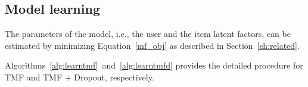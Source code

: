\subsection{Model learning}
The parameters of the model, i.e., the user and the item latent factors, can be estimated by minimizing Equation~\ref{mf_obj} as described in Section~\ref{ch:related}.
\iffalse
\begin{equation} \label{mf_drop_obj}
  \begin{aligned}
    \minimize_{\bm{p_u}, \bm{q_i}} & &\frac{1}{2}\sum_{r_{ui} \in R}
    \left(r_{ui} - \hat{r}_{u,i} \right)^2+ \frac{\beta}{2}
    \left(||\bm{p}_u||_2^2 + ||\bm{q}_i||_2^2 \right),
  \end{aligned}
\end{equation}
\noindent where the parameter $\beta$ controls the Frobenius norm regularization
of the latent factors to prevent overfitting. This optimization problem can be
solved by Stochastic Gradient Descent (SGD).
\fi
Algorithms~\ref{alg:learntmf}~and~\ref{alg:learntmfd} provides the detailed procedure
for TMF and TMF + Dropout, respectively. 

